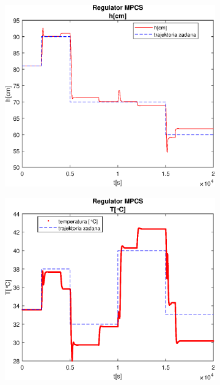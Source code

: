 \begin{figure}[h!]
   \centering
   \begin{subfigure}[b]{0.4\textwidth}
      \includegraphics[width=1\linewidth]{img/MPCSanaRK/distMPCSRKHN500Nu60l40.eps}
      \caption{}
      \label{fig:fig:distMPCSRKN500Nu60l401}
   \end{subfigure}
       
   \begin{subfigure}[b]{0.4\textwidth}
      \includegraphics[width=1\linewidth]{img/MPCSanaRK/distMPCSRKTN500Nu60l40.eps}
      \caption{}
      \label{fig:fig:distMPCSRKN500Nu60l402}
   \end{subfigure}
       

\end{figure}
